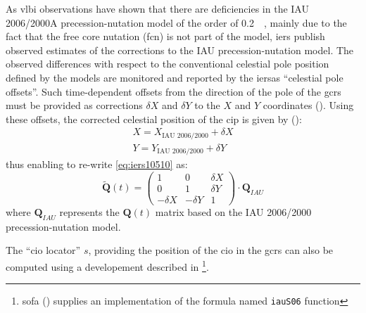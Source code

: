 As \gls{vlbi} observations have shown that there are deficiencies in the 
IAU 2006/2000A precession-nutation model of the order of \SI{0.2}{\milli\larcsecond}, 
mainly due to the fact that the free core nutation (\gls{fcn}) is not part of 
the model, \gls{iers} publish observed estimates of the corrections to the 
IAU precession-nutation model. The observed differences with respect to the 
conventional celestial pole position defined by the models are monitored and 
reported by the \gls{iers}as ``celestial pole offsets''. Such time-dependent 
offsets from the direction of the pole of the \gls{gcrs} must be provided as 
corrections $\delta X$ and $\delta Y$ to the $X$ and $Y$ coordinates (\cite{iers2010}).
Using these offsets, the corrected celestial position of the \gls{cip} is 
given by (\cite{iers2010}):
\begin{equation}
  \begin{aligned}
    X = X_{\text{IAU 2006/2000}} + \delta X \\
    Y = Y_{\text{IAU 2006/2000}} + \delta Y
  \end{aligned}
\end{equation}
thus enabling to re-write \ref{eq:iers10510} as:
\begin{equation}
  \bm{\tilde{Q}}(t) = \begin{pmatrix}
    1 & 0 & \delta X \\
    0 & 1 & \delta Y \\
    -\delta X & -\delta Y & 1
    \end{pmatrix}
    \cdot \bm{Q}_{IAU}
    \label{eq:iers10527}
\end{equation}
where $\bm{Q}_{IAU}$ represents the $\bm{Q}(t)$ matrix based on the IAU 2006/2000 
precession-nutation model.

The ``\gls{cio} locator'' $s$, providing the position of the \gls{cio} in the 
\gls{gcrs} can also be computed using a developement described in \cite{Capitaineetal2003a}
\footnote{\gls{sofa} (\cite{SOFA20210125}) supplies an implementation of the formula named \texttt{iauS06} function}.


